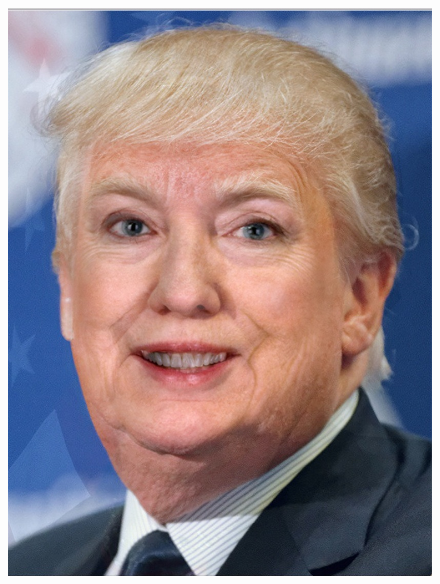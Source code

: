 \documentclass[a4paper]{article}
\begin{document}
\begin{figure}[htp]
{\begin{minipage}[b]{0.31\columnwidth}
{\includegraphics[width=1\columnwidth]{FTH.png} 
}
\label{fig:3-5:e}
\end{minipage}
}
\hfil
{}
\end{figure}
\end{document}
